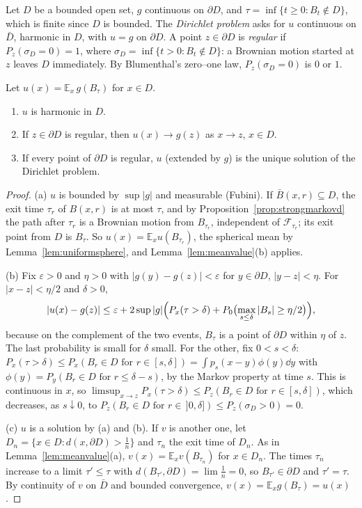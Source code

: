 Let $D$ be a bounded open set, $g$ continuous on $\partial D$, and $\tau=\inf\{t\ge0:B_t\notin D\}$, which is finite since $D$ is bounded. The \emph{Dirichlet problem} asks for $u$ continuous on $\bar D$, harmonic in $D$, with
$u=g$ on $\partial D$. A point $z\in\partial D$ is \emph{regular} if $P_z(\sigma_D=0)=1$, where $\sigma_D=\inf\{t>0:B_t\notin D\}$: a Brownian motion started at $z$ leaves $D$ immediately. By Blumenthal's zero--one law,
$P_z(\sigma_D=0)$ is $0$ or $1$.

\begin{theorem}[Kakutani, 1944]\label{thm:kakutani}
Let $u(x)=\mathbb E_x\,g(B_\tau)$ for $x\in D$.
\begin{enumerate}[label=(\alph*)]
\item $u$ is harmonic in $D$.
\item If $z\in\partial D$ is regular, then $u(x)\to g(z)$ as $x\to z$, $x\in D$.
\item If every point of $\partial D$ is regular, $u$ (extended by $g$) is the unique solution of the Dirichlet problem.
\end{enumerate}
\end{theorem}

\begin{proof}
(a) $u$ is bounded by $\sup|g|$ and measurable (Fubini). If $\bar B(x,r)\subseteq D$, the exit time $\tau_r$ of $B(x,r)$ is at most $\tau$, and by Proposition~\ref{prop:strongmarkovd} the path after $\tau_r$ is a Brownian motion from
$B_{\tau_r}$, independent of $\mathcal F_{\tau_r}$; its exit point from $D$ is $B_\tau$. So $u(x)=\mathbb E_xu(B_{\tau_r})$, the spherical mean by Lemma~\ref{lem:uniformsphere}, and Lemma~\ref{lem:meanvalue}(b) applies.

(b) Fix $\varepsilon>0$ and $\eta>0$ with $|g(y)-g(z)|<\varepsilon$ for $y\in\partial D$, $|y-z|<\eta$. For $|x-z|<\eta/2$ and $\delta>0$,
\[
|u(x)-g(z)|\le\varepsilon+2\sup|g|\Bigl(P_x(\tau>\delta)+P_0\bigl(\max_{s\le\delta}|B_s|\ge\eta/2\bigr)\Bigr),
\]
because on the complement of the two events, $B_\tau$ is a point of $\partial D$ within $\eta$ of $z$. The last probability is small for $\delta$ small. For the other, fix $0<s<\delta$: $P_x(\tau>\delta)\le P_x(B_r\in D\text{ for }r\in[s,\delta])=
\int p_s(x-y)\phi(y)\dd y$ with $\phi(y)=P_y(B_r\in D\text{ for }r\le\delta-s)$, by the Markov property at time $s$. This is continuous in $x$, so
$\limsup_{x\to z}P_x(\tau>\delta)\le P_z(B_r\in D\text{ for }r\in[s,\delta])$, which decreases, as $s\downarrow0$, to $P_z(B_r\in D\text{ for }r\in\,]0,\delta])\le P_z(\sigma_D>0)=0$.

(c) $u$ is a solution by (a) and (b). If $v$ is another one, let $D_n=\{x\in D:d(x,\partial D)>\frac1n\}$ and $\tau_n$ the exit time of $D_n$. As in Lemma~\ref{lem:meanvalue}(a), $v(x)=\mathbb E_xv(B_{\tau_n})$ for $x\in D_n$. The
times $\tau_n$ increase to a limit $\tau'\le\tau$ with $d(B_{\tau'},\partial D)=\lim\frac1n=0$, so $B_{\tau'}\in\partial D$ and $\tau'=\tau$. By continuity of $v$ on $\bar D$ and bounded convergence, $v(x)=\mathbb E_xg(B_\tau)=u(x)$.
\end{proof}

